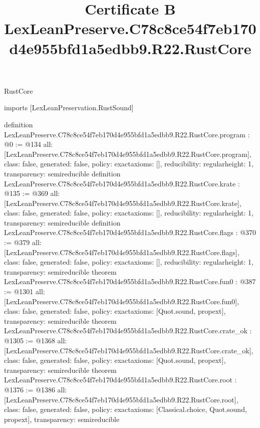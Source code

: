 \begin{lexlean}{RustCore}
\title{Certificate B LexLeanPreserve.C78c8ce54f7eb170d4e955bfd1a5edbb9.R22.RustCore}
\begin{coremodule}
imports [LexLeanPreservation.RustSound]

definition LexLeanPreserve.C78c8ce54f7eb170d4e955bfd1a5edbb9.R22.RustCore.program : @0 := @134 {
  all: [LexLeanPreserve.C78c8ce54f7eb170d4e955bfd1a5edbb9.R22.RustCore.program],
  class: false,
  generated: false,
  policy: exact{axioms: []},
  reducibility: regular{height: 1},
  transparency: semireducible
}
definition LexLeanPreserve.C78c8ce54f7eb170d4e955bfd1a5edbb9.R22.RustCore.krate : @135 := @369 {
  all: [LexLeanPreserve.C78c8ce54f7eb170d4e955bfd1a5edbb9.R22.RustCore.krate],
  class: false,
  generated: false,
  policy: exact{axioms: []},
  reducibility: regular{height: 1},
  transparency: semireducible
}
definition LexLeanPreserve.C78c8ce54f7eb170d4e955bfd1a5edbb9.R22.RustCore.flags : @370 := @379 {
  all: [LexLeanPreserve.C78c8ce54f7eb170d4e955bfd1a5edbb9.R22.RustCore.flags],
  class: false,
  generated: false,
  policy: exact{axioms: []},
  reducibility: regular{height: 1},
  transparency: semireducible
}
theorem LexLeanPreserve.C78c8ce54f7eb170d4e955bfd1a5edbb9.R22.RustCore.fun0 : @387 := @1301 {
  all: [LexLeanPreserve.C78c8ce54f7eb170d4e955bfd1a5edbb9.R22.RustCore.fun0],
  class: false,
  generated: false,
  policy: exact{axioms: [Quot.sound, propext]},
  transparency: semireducible
}
theorem LexLeanPreserve.C78c8ce54f7eb170d4e955bfd1a5edbb9.R22.RustCore.crate_ok : @1305 := @1368 {
  all: [LexLeanPreserve.C78c8ce54f7eb170d4e955bfd1a5edbb9.R22.RustCore.crate_ok],
  class: false,
  generated: false,
  policy: exact{axioms: [Quot.sound, propext]},
  transparency: semireducible
}
theorem LexLeanPreserve.C78c8ce54f7eb170d4e955bfd1a5edbb9.R22.RustCore.root : @1376 := @1386 {
  all: [LexLeanPreserve.C78c8ce54f7eb170d4e955bfd1a5edbb9.R22.RustCore.root],
  class: false,
  generated: false,
  policy: exact{axioms: [Classical.choice, Quot.sound, propext]},
  transparency: semireducible
}


\end{coremodule}
\end{lexlean}
